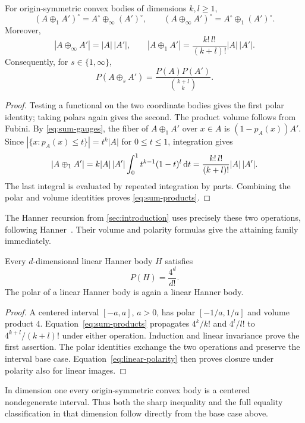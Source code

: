 \begin{lemma}\label{lem:sums}
For origin-symmetric convex bodies of dimensions $k,l\ge1$,
\begin{equation}\label{eq:sum-polars}
 (A\oplus_1 A')^\circ=A^\circ\oplus_\infty(A')^\circ,
 \qquad
 (A\oplus_\infty A')^\circ=A^\circ\oplus_1(A')^\circ.
\end{equation}
Moreover,
\begin{equation}\label{eq:sum-volumes}
 |A\oplus_\infty A'|=|A|\,|A'|,
 \qquad
 |A\oplus_1 A'|=\frac{k!\,l!}{(k+l)!}|A|\,|A'|.
\end{equation}
Consequently, for $s\in\{1,\infty\}$,
\begin{equation}\label{eq:sum-products}
 P(A\oplus_s A')=\frac{P(A)P(A')}{\binom{k+l}{k}}.
\end{equation}
\end{lemma}

\begin{proof}
Testing a functional on the two coordinate bodies gives the first polar identity; taking polars again gives the second. The product volume follows from Fubini. By \eqref{eq:sum-gauges}, the fiber of $A\oplus_1 A'$ over $x\in A$ is $(1-p_A(x))A'$. Since $|\{x:p_A(x)\le t\}|=t^k|A|$ for $0\le t\le1$, integration gives
\[
 |A\oplus_1 A'|
 =k|A|\,|A'|\int_0^1t^{k-1}(1-t)^l\,\mathrm{d} t
 =\frac{k!\,l!}{(k+l)!}|A|\,|A'|.
\]
The last integral is evaluated by repeated integration by parts. Combining the polar and volume identities proves \eqref{eq:sum-products}.
\end{proof}

The Hanner recursion from \cref{sec:introduction} uses precisely these two operations, following Hanner~\cite{Hanner1956}. Their volume and polarity formulas give the attaining family immediately.

\begin{lemma}\label{lem:hanner}
Every $d$-dimensional linear Hanner body $H$ satisfies
\[
 P(H)=\frac{4^d}{d!}.
\]
The polar of a linear Hanner body is again a linear Hanner body.
\end{lemma}

\begin{proof}
A centered interval $[-a,a]$, $a>0$, has polar $[-1/a,1/a]$ and volume product $4$. Equation~\eqref{eq:sum-products} propagates $4^k/k!$ and $4^l/l!$ to $4^{k+l}/(k+l)!$ under either operation. Induction and linear invariance prove the first assertion. The polar identities exchange the two operations and preserve the interval base case. Equation~\eqref{eq:linear-polarity} then proves closure under polarity also for linear images.
\end{proof}

In dimension one every origin-symmetric convex body is a centered nondegenerate interval. Thus both the sharp inequality and the full equality classification in that dimension follow directly from the base case above.

